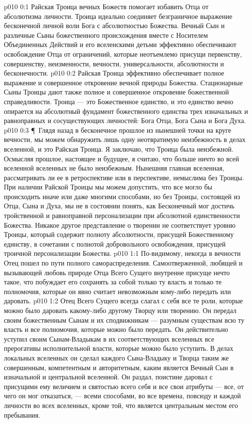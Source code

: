 \vs p010 0:1 Райская Троица вечных Божеств помогает избавить Отца от абсолютизма личности. Троица идеально соединяет безграничное выражение бесконечной личной воли Бога с абсолютностью Божества. Вечный Сын и различные Сыны божественного происхождения вместе с Носителем Объединенных Действий и его вселенскими детьми эффективно обеспечивают освобождение Отца от ограничений, которые неотъемлемо присущи первенству, совершенству, неизменности, вечности, универсальности, абсолютности и бесконечности.
\vs p010 0:2 Райская Троица эффективно обеспечивает полное выражение и совершенное откровение вечной природы Божества. Стационарные Сыны Троицы дают также полное и совершенное откровение божественной справедливости. Троица --- это Божественное единство, и это единство вечно опирается на абсолютный фундамент божественного единства трех изначальных и равноправных и сосуществующих личностей: Бога Отца, Бога Сына и Бога Духа.
\vs p010 0:3 \P\ Глядя назад в бесконечное прошлое из нынешней точки на круге вечности, мы можем обнаружить лишь одну неотвратимую неизбежность в делах вселенной, и это Райская Троица. Я заключаю, что Троица была неизбежной. Осмысляя прошлое, настоящее и будущее, я считаю, что больше ничто во всей вселенной вселенных не было неизбежным. Нынешняя главная вселенная, рассматривать ли ее в ретроспективе или в перспективе, немыслима без Троицы. При наличии Райской Троицы мы можем допустить, что все могло бы происходить иначе или даже многими способами, но без Троицы, состоящей из Отца, Сына и Духа, мы не в состоянии понять, как Бесконечный мог достичь тройственной и равноправной персонализации при абсолютной единственности Божества. Никакое другое представление о творении не соответствует уровню Троицы, который содержит полноту абсолютности, присущей Божественному единству, в сочетании с полнотой добровольного освобождения, присущей троичной персонализации Божества.
\vs p010 1:1 По\hyp{}видимому, некогда в вечности Отец пошел по пути полного самораспределения. Самоотверженной, любящей и вызывающей любовь природе Отца Всего Сущего внутренне присуще нечто такое, что побуждает его сохранять за собой только ту власть и только те полномочия, которые он явно считает невозможным кому\hyp{}либо передать или даровать.
\vs p010 1:2 Отец Всего Сущего всегда слагал с себя все те роли, которые можно было даровать какому\hyp{}либо другому Творцу или творению. Он передал своим божественным Сынам и их сподвижникам --- разумным существам всю ту власть и все полномочия, которые можно было передать. Он действительно уступил своим Сынам\hyp{}Владыкам в их соответствующих вселенных все прерогативы исполнительной власти, которые можно было уступить. В делах локальных вселенных он сделал каждого Сына\hyp{}Владыку и Творца таким же совершенным, компетентным и авторитетным, каким является Вечный Сын в изначальной и центральной вселенной. Он раздал, поистине даровал с присущими ему величием и святостью всего себя и все свои атрибуты --- все, от чего он мог отказаться, --- всеми способами, во все времена, повсюду и каждой личности во всех вселенных, кроме той, что является центральным местом его пребывания.

